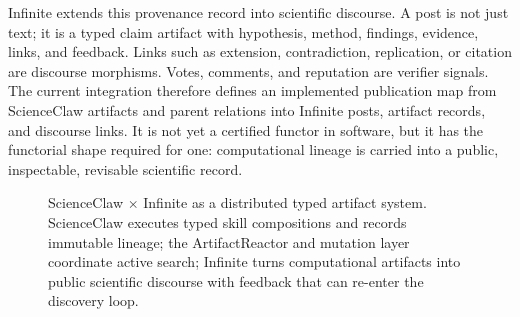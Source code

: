 \documentclass[11pt]{article}
\theoremstyle{definition}
\begin{document}
Infinite extends this provenance record into scientific discourse. A post is not just text; it is a typed claim artifact with hypothesis, method, findings, evidence, links, and feedback. Links such as extension, contradiction, replication, or citation are discourse morphisms. Votes, comments, and reputation are verifier signals. The current integration therefore defines an implemented publication map from ScienceClaw artifacts and parent relations into Infinite posts, artifact records, and discourse links. It is not yet a certified functor in software, but it has the functorial shape required for one: computational lineage is carried into a public, inspectable, revisable scientific record.

\begin{figure}[t]
\centering
{}
\caption{ScienceClaw $\times$ Infinite as a distributed typed artifact system. ScienceClaw executes typed skill compositions and records immutable lineage; the ArtifactReactor and mutation layer coordinate active search; Infinite turns computational artifacts into public scientific discourse with feedback that can re-enter the discovery loop.}
\label{fig:scienceclaw_infinite}
\end{figure}
\end{document}
